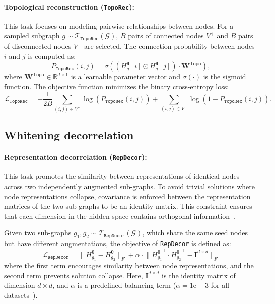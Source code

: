 \documentclass{article}
\newcommand{\toporec}{\texttt{TopoRec}\xspace}
\newcommand{\repdecor}{\texttt{RepDecor}\xspace}
\begin{document}
\paragraph{Topological reconstruction (\toporec):}
This task focuses on modeling pairwise relationships between nodes. For a sampled subgraph $g \sim \mathcal{T}_{\toporec}(\mathcal{G})$, $B$ pairs of connected nodes $V^{+}$ and $B$ pairs of disconnected nodes $V^{-}$ are selected. The connection probability between nodes $i$ and $j$ is computed as:
\begin{equation}
    P_{\toporec}(i,j) = \sigma((H_g^{\boldsymbol{\theta}}[i] \odot H_g^{\boldsymbol{\theta}}[j]) \cdot \mathbf{W}^{\text{Topo}}),
\end{equation}
where $\mathbf{W}^{\text{Topo}} \in \mathbb{R}^{d \times 1}$ is a learnable parameter vector and $\sigma(\cdot)$ is the sigmoid function. The objective function minimizes the binary cross-entropy loss:
\begin{equation}
\mathcal{L}_{\toporec} = -\frac{1}{2B} \sum_{(i,j)\in V^+} \log(P_{\toporec}(i,j)) + \sum_{(i,j)\in V^-} \log(1-P_{\toporec}(i,j)).
\end{equation}


\subsection{Whitening decorrelation}

\paragraph{Representation decorrelation (\repdecor):}
This task promotes the similarity between representations of identical nodes across two independently augmented sub-graphs. To avoid trivial solutions where node representations collapse, covariance is enforced between the representation matrices of the two sub-graphs to be an identity matrix. This constraint ensures that each dimension in the hidden space contains orthogonal information~\citep{ermolov2021whitening,zbontar2021barlow,zhang2021canonical}.

Given two sub-graphs $g_1, g_2 \sim \mathcal{T}_{\repdecor}(\mathcal{G})$, which share the same seed nodes but have different augmentations, the objective of \repdecor is defined as:
\begin{equation}
\mathcal{L}_{\repdecor} = \Big\lVert H_{g_1}^{\boldsymbol{\theta}} - H_{g_2}^{\boldsymbol{\theta}} \Big\rVert_F + \alpha \cdot \Big\lVert {H_{g_1}^{\boldsymbol{\theta}}}^\intercal \cdot {H_{g_2}^{\boldsymbol{\theta}}}^\intercal - \mathbf{I}^{d \times d} \Big\rVert_F
\end{equation}
where the first term encourages similarity between node representations, and the second term prevents solution collapse. Here, $\mathbf{I}^{d \times d}$ is the identity matrix of dimension $d \times d$, and $\alpha$ is a predefined balancing term ($\alpha = 1\mathrm{e}-3$ for all datasets~\cite{ju2022multi}).
\end{document}
